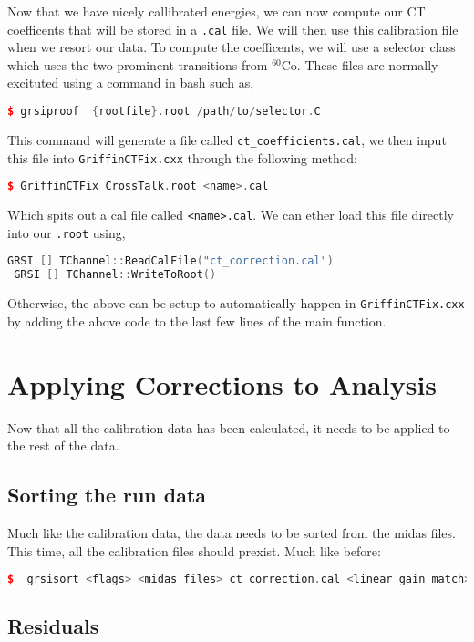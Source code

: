 \documentclass[10pt]{article} %
\begin{document}
Now that we have nicely callibrated energies, we can now compute our CT coefficents that will be stored in a \texttt{.cal} file.
We will then use this calibration file when we resort our data.
To compute the coefficents, we will use a selector class which uses the two prominent transitions from ${^{60}}$Co.
These files are normally excituted using a command in bash such as,
\begin{lstlisting}[language=c++]
 $ grsiproof  {rootfile}.root /path/to/selector.C
 \end{lstlisting}
This command will generate a file called  \lstinline{ct_coefficients.cal}, we then input this file into \texttt{GriffinCTFix.cxx} through the following method:
\begin{lstlisting}[language=c++]
 $ GriffinCTFix CrossTalk.root <name>.cal
  \end{lstlisting}
Which spits out a cal file called \texttt{<name>.cal}. We can ether load this file directly into our \texttt{.root} using,
\begin{lstlisting}[language=c++]
 GRSI [] TChannel::ReadCalFile("ct_correction.cal")
 GRSI [] TChannel::WriteToRoot()
\end{lstlisting}
Otherwise, the above can be setup to automatically happen in \texttt{GriffinCTFix.cxx} by adding the above code to the last few lines of the main function.

\section{Applying Corrections to Analysis}

Now that all the calibration data has been calculated, it needs to be applied to the rest of the data.

\subsection{Sorting the run data}

Much like the calibration data, the data needs to be sorted from the midas files.
This time, all the calibration files should prexist.
Much like before:

\begin{lstlisting}[language=c++]
$  grsisort <flags> <midas files> ct_correction.cal <linear gain match>.cal
\end{lstlisting}


\subsection{Residuals}
\end{document}
